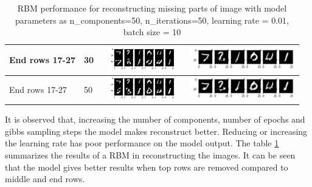 \begin{table}[!htpb]
\begin{tabular}{|p{4cm}|p{2cm}|p{4cm}|p{4.5cm}|}
		End rows 17-27 & 30 & \includegraphics[height=1cm, width=3.5cm]{Exercise4/Report/reconst_gibs_30_row_17-27} & \includegraphics[height=1cm]{Exercise4/Report/reconst_gibs_30_row_17-27_1}\\ \hline
		End rows 17-27 & 50 & \includegraphics[height=1cm, width=3.5cm]{Exercise4/Report/reconst_gibs_50_row_17-27_1} & \includegraphics[height=1cm]{Exercise4/Report/reconst_gibs_50_row_17-27}\\ \hline
		\end{tabular}
	\captionsetup{format = hang}
	\caption{RBM performance for reconstructing missing parts of image with model parameters as n\_components=50, n\_iterations=50, learning rate = 0.01, batch size = 10}
	\label{table:4.1}
\end{table}
It is observed that, increasing the number of components, number of epochs  and gibbs sampling steps the model makes reconstruct better. Reducing or increasing the learning rate has poor performance on the model output. The table \ref{table:4.1} summarizes the results of a RBM in reconstructing the images. It can be seen that the model gives better results when top rows are removed compared to middle and end rows.
